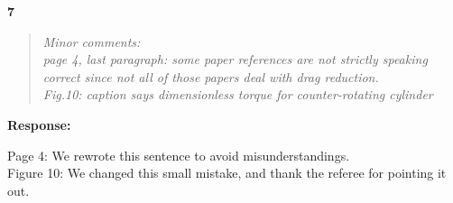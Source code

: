 \documentclass[10pt]{article}
\newcommand{\strong}[1]{\textbf{#1}}
\newcommand{\question}[1]{\begin{quote} \emph{#1}  \end{quote} }
\begin{document}
\noindent \strong{7}

\question{Minor comments:\\
page 4, last paragraph: some paper references are not strictly speaking correct since not all of those papers deal with drag reduction.\\
Fig.10: caption says dimensionless torque for counter-rotating cylinder }

\noindent \strong{Response:} 

\noindent Page 4: We rewrote this sentence to avoid misunderstandings. \\ Figure 10: We changed this small mistake, and thank the referee for pointing it out.\\




	
\end{document}
